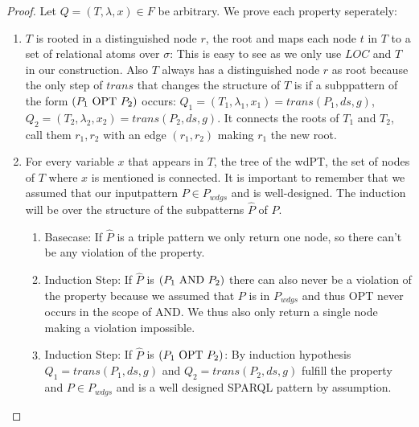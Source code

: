 \begin{proof}
	Let $Q=(T,\lambda,x) \in F$ be arbitrary. We prove each property seperately:
	\begin{enumerate}
		\item $T$ is rooted in a distinguished node $r$, the root and maps
			each node $t$ in  $T$ to a set of relational atoms over $\sigma$:
			This is easy to see as we only use $LOC$ and $T$ in our
			construction. Also $T$ always has a distinguished node $r$ as root
			because the only step of $trans$ that changes the structure of $T$
			is if a subppattern of the form $(P_1 \mbox{ OPT } P_2)$ occurs: 
			$Q_1 = (T_1,\lambda_1,x_1)  = trans(P_1,ds,g)$,
			$Q_2 = (T_2,\lambda_2,x_2)  = trans(P_2,ds,g)$. 
			It connects the roots of $T_1$ and $T_2$, call them $r_1,r_2$ with
			an edge $(r_1,r_2)$ making $r_1$ the new root.  

		\item For every variable $x$ that appears
			in $T$, the tree of the wdPT, the set of nodes of $T$ where $x$ is mentioned is connected.
			It is important to remember that we assumed that our inputpattern $P
			\in P_{wdgs}$ and is well-designed.
			The induction will be over the structure of the subpatterns $\hat{P}$ of $P$.
			\begin{enumerate}
			
				\item Basecase: If $\hat{P}$ is a triple pattern we only return one node, so there can't be any
					violation of the property.

				\item Induction Step: If $\hat{P}$ is $(P_1 \mbox{ AND }  P_2)$ there can 
					also never be a violation of the
					property because we assumed that $P$ is in $P_{wdgs}$ and thus OPT never
					occurs in the scope of AND. We thus also only return a single node making a
					violation impossible.

				\item Induction Step: If $\hat{P}$ is $(P_1 \mbox{ OPT }  P_2)$:
					By induction hypothesis $Q_1 = trans(P_1,ds,g)$ and $Q_2 =
					trans(P_2,ds,g)$ fulfill the property and $P \in P_{wdgs}$ 
					and is a well designed SPARQL pattern by assumption. 


\end{enumerate}
\end{enumerate}
\end{proof}
